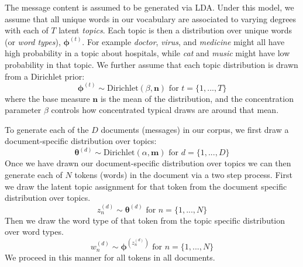 \documentclass{pnastwo}
\begin{document}
\begin{article}

The message content is assumed to be generated via LDA. Under this model, we assume that all unique words in our vocabulary are associated to varying degrees with each of $T$ latent \emph{topics}. Each topic is then a distribution over unique words (or \emph{word types}), $\boldsymbol{\phi}^{(t)}$. For example \emph{doctor}, \emph{virus}, and \emph{medicine} might all have high probability in a topic about hospitals, while \emph{cat} and \emph{music} might have low probability in that topic. We further assume that each topic distribution is drawn from a Dirichlet prior: 
\begin{equation}
	\boldsymbol{\phi}^{(t)} \sim \text{Dirichlet}(\beta,\boldsymbol{n}) \text{ for } t = \{1, ..., T\}
\end{equation}
where the base measure $\boldsymbol{n}$ is the mean of the distribution, and the concentration parameter $\beta$ controls how concentrated typical draws are around that mean. 

To generate each of the $D$ documents (messages) in our corpus, we first draw a document-specific distribution over topics:
\begin{equation}
	\boldsymbol{\theta}^{(d)} \sim \text{Dirichlet}(\alpha,\boldsymbol{m}) \text{ for } d = \{1,...,D\}
\end{equation}
Once we have drawn our document-specific distribution over topics we can then generate each of $N$ tokens (words) in the document via a two step process. First we draw the latent topic assignment for that token from the document specific distribution over topics.
\begin{equation}
	z_n^{(d)} \sim \boldsymbol{\theta}^{(d)} \text{ for } n = \{1,...,N\}
\end{equation}
 Then we draw the word type of that token from the topic specific distribution over word types.
 \begin{equation}
 	w_n^{(d)} \sim \boldsymbol{\phi}^{(z_n^{(d)})} \text{ for } n = \{1,...,N\}
 \end{equation}
We proceed in this manner for all tokens in all documents. 



\end{article}
\end{document}
